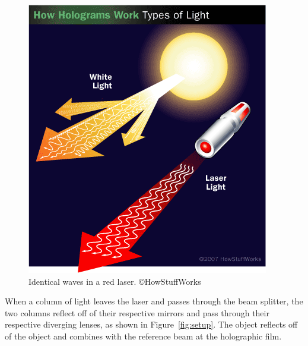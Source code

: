 \begin{figure}[!ht]
\centering
\includegraphics[width=0.9\linewidth,keepaspectratio=true]{figs/hologram-10.png}
\caption{Identical waves in a red laser. ©HowStuffWorks}
\label{fig:laser}
\end{figure}

When a column of light leaves the laser and passes through the beam splitter, the two columns reflect off of their respective mirrors and pass through their respective diverging lenses, as shown in Figure~\ref{fig:setup}.
The object reflects off of the object and combines with the reference beam at the holographic film.


